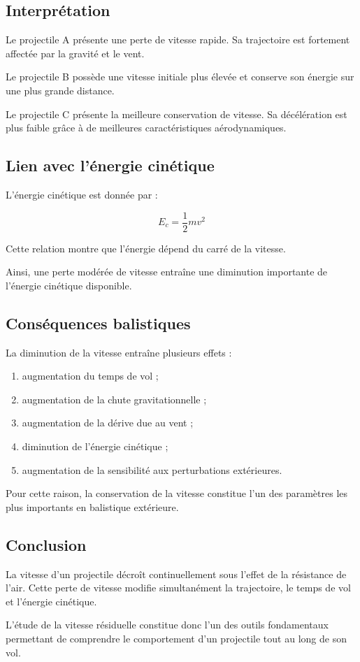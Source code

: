 \subsection{Interprétation}

Le projectile A présente une perte de vitesse rapide. Sa trajectoire est fortement affectée par la gravité et le vent.

Le projectile B possède une vitesse initiale plus élevée et conserve son énergie sur une plus grande distance.

Le projectile C présente la meilleure conservation de vitesse. Sa décélération est plus faible grâce à de meilleures caractéristiques aérodynamiques.

\subsection{Lien avec l'énergie cinétique}

L'énergie cinétique est donnée par :

\begin{equation}
E_c=\frac{1}{2}mv^2
\end{equation}

Cette relation montre que l'énergie dépend du carré de la vitesse.

Ainsi, une perte modérée de vitesse entraîne une diminution importante de l'énergie cinétique disponible.

\subsection{Conséquences balistiques}

La diminution de la vitesse entraîne plusieurs effets :

\begin{enumerate}
\item augmentation du temps de vol ;
\item augmentation de la chute gravitationnelle ;
\item augmentation de la dérive due au vent ;
\item diminution de l'énergie cinétique ;
\item augmentation de la sensibilité aux perturbations extérieures.
\end{enumerate}

Pour cette raison, la conservation de la vitesse constitue l'un des paramètres les plus importants en balistique extérieure.

\subsection{Conclusion}

La vitesse d'un projectile décroît continuellement sous l'effet de la résistance de l'air. Cette perte de vitesse modifie simultanément la trajectoire, le temps de vol et l'énergie cinétique.

L'étude de la vitesse résiduelle constitue donc l'un des outils fondamentaux permettant de comprendre le comportement d'un projectile tout au long de son vol.

